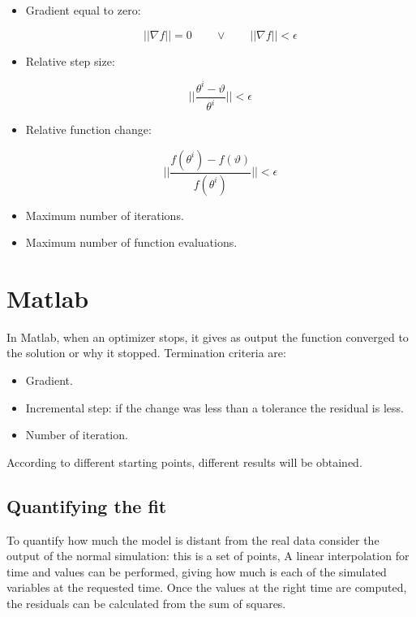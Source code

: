   \begin{itemize}
    \item Gradient equal to zero:

      $$||\nabla f||= 0\qquad\lor\qquad ||\nabla f||<\epsilon$$

    \item Relative step size:

      $$\biggr\vert\biggr\vert\frac{\theta^i-\vartheta}{\theta^i}\biggr\vert\biggr\vert<\epsilon$$

    \item Relative function change:

      $$\biggr\vert\biggr\vert\frac{f(\theta^i)-f(\vartheta)}{f(\theta^i)}\biggr\vert\biggr\vert<\epsilon$$

    \item Maximum number of iterations.
    \item Maximum number of function evaluations.
  \end{itemize}

\section{Matlab}
In Matlab, when an optimizer stops, it gives as output the function converged to the solution or why it stopped.
Termination criteria are:

\begin{multicols}{2}
  \begin{itemize}
    \item Gradient.
    \item Incremental step: if the change was less than a tolerance the residual is less.
    \item Number of iteration.
  \end{itemize}
\end{multicols}

According to different starting points, different results will be obtained.

  \subsection{Quantifying the fit}
  To quantify how much the model is distant from the real data consider the output of the normal simulation: this is a set of points,
  A linear interpolation for time and values can be performed, giving how much is each of the simulated variables at the requested time.
  Once the values at the right time are computed, the residuals can be calculated from the sum of squares.

